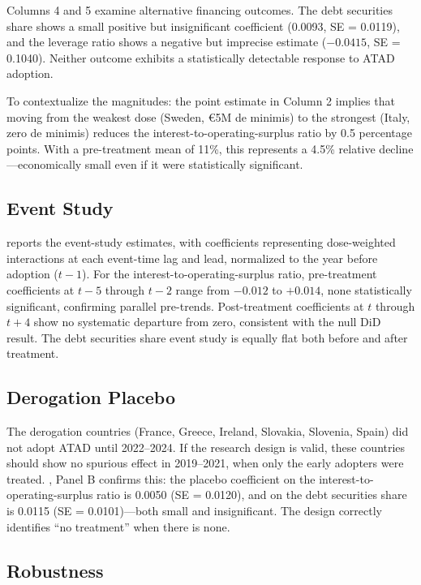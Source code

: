 \documentclass[12pt]{article}
\begin{document}
Columns 4 and 5 examine alternative financing outcomes. The debt securities share shows a small positive but insignificant coefficient (0.0093, SE = 0.0119), and the leverage ratio shows a negative but imprecise estimate ($-0.0415$, SE = 0.1040). Neither outcome exhibits a statistically detectable response to ATAD adoption.

To contextualize the magnitudes: the point estimate in Column 2 implies that moving from the weakest dose (Sweden, \euro{}5M de minimis) to the strongest (Italy, zero de minimis) reduces the interest-to-operating-surplus ratio by 0.5 percentage points. With a pre-treatment mean of 11\%, this represents a 4.5\% relative decline---economically small even if it were statistically significant.

\subsection{Event Study}



 reports the event-study estimates, with coefficients representing dose-weighted interactions at each event-time lag and lead, normalized to the year before adoption ($t-1$). For the interest-to-operating-surplus ratio, pre-treatment coefficients at $t-5$ through $t-2$ range from $-0.012$ to $+0.014$, none statistically significant, confirming parallel pre-trends. Post-treatment coefficients at $t$ through $t+4$ show no systematic departure from zero, consistent with the null DiD result. The debt securities share event study is equally flat both before and after treatment.

\subsection{Derogation Placebo}

The derogation countries (France, Greece, Ireland, Slovakia, Slovenia, Spain) did not adopt ATAD until 2022--2024. If the research design is valid, these countries should show no spurious effect in 2019--2021, when only the early adopters were treated. , Panel B confirms this: the placebo coefficient on the interest-to-operating-surplus ratio is 0.0050 (SE = 0.0120), and on the debt securities share is 0.0115 (SE = 0.0101)---both small and insignificant. The design correctly identifies ``no treatment'' when there is none.

\subsection{Robustness}
\end{document}
